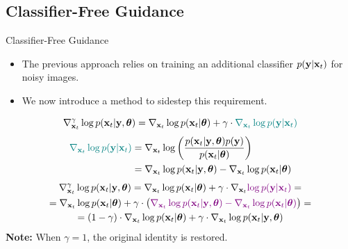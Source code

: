 \documentclass{beamer}
\begin{document}
\subsection{Classifier-Free Guidance}
\begin{frame}{Classifier-Free Guidance}
	\begin{itemize}
		\item The previous approach relies on training an additional classifier $p(\mathbf{y} | \mathbf{x}_t)$ for noisy images.	
		\item We now introduce a method to sidestep this requirement.
	\end{itemize}
	\[
		\nabla_{\mathbf{x}_t}^{\gamma} \log p(\mathbf{x}_t | \mathbf{y}, \boldsymbol{\theta}) = \nabla_{\mathbf{x}_t} \log p(\mathbf{x}_t | \boldsymbol{\theta}) + \gamma \cdot {\color{teal}\nabla_{\mathbf{x}_t} \log p(\mathbf{y}| \mathbf{x}_t)}
	\]
	\vspace{-0.7cm}
	\begin{align*}
		{\color{teal}\nabla_{\mathbf{x}_t} \log p(\mathbf{y}| \mathbf{x}_t)} &= \nabla_{\mathbf{x}_t} \log \left( \frac{p(\mathbf{x}_t| \mathbf{y}, \boldsymbol{\theta}) p(\mathbf{y})}{p(\mathbf{x}_t | \boldsymbol{\theta})} \right) \\
		&=  \nabla_{\mathbf{x}_t} \log p(\mathbf{x}_t| \mathbf{y}, \boldsymbol{\theta}) -\nabla_{\mathbf{x}_t} \log  p(\mathbf{x}_t | \boldsymbol{\theta})
	\end{align*}
	\vspace{-0.8cm}
	\begin{multline*}
		\nabla_{\mathbf{x}_t}^{\gamma} \log p(\mathbf{x}_t | \mathbf{y}, \boldsymbol{\theta}) = \nabla_{\mathbf{x}_t} \log p(\mathbf{x}_t | \boldsymbol{\theta}) + \gamma \cdot \nabla_{\mathbf{x}_t} {\color{violet}\log p(\mathbf{y} | \mathbf{x}_t)} = \\
		= \nabla_{\mathbf{x}_t} \log p(\mathbf{x}_t | \boldsymbol{\theta}) + \gamma \cdot \bigl( {\color{violet}\nabla_{\mathbf{x}_t} \log p(\mathbf{x}_t| \mathbf{y}, \boldsymbol{\theta}) - \nabla_{\mathbf{x}_t} \log  p(\mathbf{x}_t | \boldsymbol{\theta})} \bigr) = \\
		=  (1 - \gamma) \cdot  \nabla_{\mathbf{x}_t} \log p(\mathbf{x}_t | \boldsymbol{\theta}) + \gamma \cdot  \nabla_{\mathbf{x}_t} \log p(\mathbf{x}_t| \mathbf{y}, \boldsymbol{\theta})
	\end{multline*}
	\textbf{Note:} When $\gamma = 1$, the original identity is restored.
\end{frame}
\end{document}
